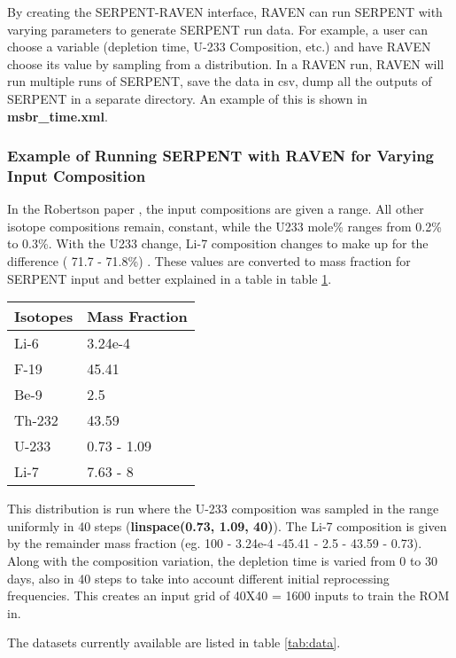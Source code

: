 \documentclass{article}
\begin{document}
By creating the SERPENT-RAVEN interface, RAVEN can run SERPENT
with varying parameters to generate SERPENT run data. For example,
a user can choose a variable (depletion time, U-233 Composition, etc.)
and have RAVEN choose its value by sampling from a distribution. 
In a RAVEN run, RAVEN will run multiple runs of SERPENT, save the 
data in csv, dump all the outputs of SERPENT in a separate directory.
An example of this is shown in \textbf{msbr\_time.xml}.

\subsubsection{Example of Running SERPENT with RAVEN for Varying Input Composition}
In the Robertson paper \cite{robertson_conceptual_1971}, the
input compositions are given a range. All other isotope
compositions remain, constant, while the U233
mole\% ranges from 0.2\% to 0.3\%. With the U233 change,
Li-7 composition changes to make up
for the difference ( 71.7 - 71.8\%) .
These values are converted  to mass fraction
for SERPENT input and better explained in a table in table \ref{tab:comp}.
\begin{table}
\begin{center}
\begin{tabular}{ l l }
    \hline
    Isotopes & Mass Fraction \\
    \hline
    Li-6 & 3.24e-4 \\
    F-19 & 45.41 \\
    Be-9 & 2.5 \\ 
    Th-232 & 43.59 \\
    U-233 & 0.73 - 1.09 \\
    Li-7 & 7.63 - 8\\
    \hline
\end{tabular}
\label{tab:comp}
\end{center}
\end{table}

This distribution is run where the U-233 composition was
sampled in the range uniformly in 40 steps 
(\textbf{linspace(0.73, 1.09, 40)}). The Li-7 composition
is given by the remainder mass fraction 
(eg. 100 - 3.24e-4 -45.41 - 2.5 - 43.59 - 0.73).
Along with the composition variation,
the depletion time is varied from 0 to 30 days, also
in 40 steps to take into account
different initial reprocessing frequencies.
This creates an input grid of 40X40 = 1600 inputs to
train the ROM in.

The datasets currently available are listed in table \ref{tab:data}.
\end{document}
